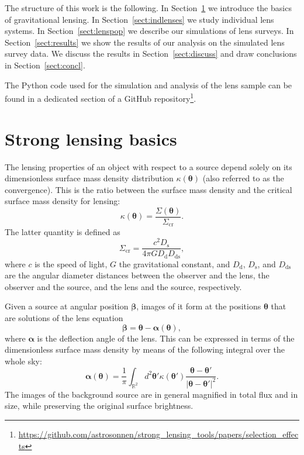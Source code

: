 \documentclass{aa}
\def\Sref#1{Section~\ref{#1}\xspace}
\begin{document}
The structure of this work is the following.
In \Sref{sect:basics} we introduce the basics of gravitational lensing.
In \Sref{sect:indlenses} we study individual lens systems. 
In \Sref{sect:lenspop} we describe our simulations of lens surveys.
In \Sref{sect:results} we show the results of our analysis on the simulated lens survey data.
We discuss the results in \Sref{sect:discuss} and draw conclusions in \Sref{sect:concl}.

The Python code used for the simulation and analysis of the lens sample can be found in a dedicated section of a GitHub repository\footnote{\url{https://github.com/astrosonnen/strong_lensing_tools/papers/selection_effects}}.


\section{Strong lensing basics}\label{sect:basics}

The lensing properties of an object with respect to a source depend solely on its dimensionless surface mass density distribution $\kappa(\boldsymbol\theta)$ (also referred to as the convergence). 
This is the ratio between the surface mass density and the critical surface mass density for lensing:
\begin{equation}
\kappa(\boldsymbol\theta) = \dfrac{\Sigma(\boldsymbol\theta)}{\Sigma_{\mathrm{cr}}}.
\end{equation}
The latter quantity is defined as
\begin{equation}
\Sigma_{\mathrm{cr}} = \dfrac{c^2D_\mathrm{s}}{4\pi G D_\mathrm{d} D_{\mathrm{ds}}},
\end{equation}
where $c$ is the speed of light, $G$ the gravitational constant, and $D_\mathrm{d}$, $D_\mathrm{s}$, and $D_{\mathrm{ds}}$ are the angular diameter distances between the observer and the lens, the observer and the source, and the lens and the source, respectively.

Given a source at angular position $\boldsymbol\beta$, images of it form at the positions $\boldsymbol\theta$ that are solutions of the lens equation
\begin{equation}\label{eq:lenseq}
\boldsymbol\beta = \boldsymbol\theta - \boldsymbol\alpha(\boldsymbol\theta),
\end{equation}
where $\boldsymbol\alpha$ is the deflection angle of the lens.
This can be expressed in terms of the dimensionless surface mass density by means of the following integral over the whole sky:
\begin{equation}
\boldsymbol\alpha(\boldsymbol\theta) = \frac{1}{\pi}\int_{\mathbb{R}^2} d^2\boldsymbol\theta' \kappa(\boldsymbol\theta')\dfrac{\boldsymbol\theta - \boldsymbol\theta'}{|\boldsymbol\theta - \boldsymbol\theta'|^2}.
\end{equation}
The images of the background source are in general magnified in total flux and in size, while preserving the original surface brightness.
\end{document}
